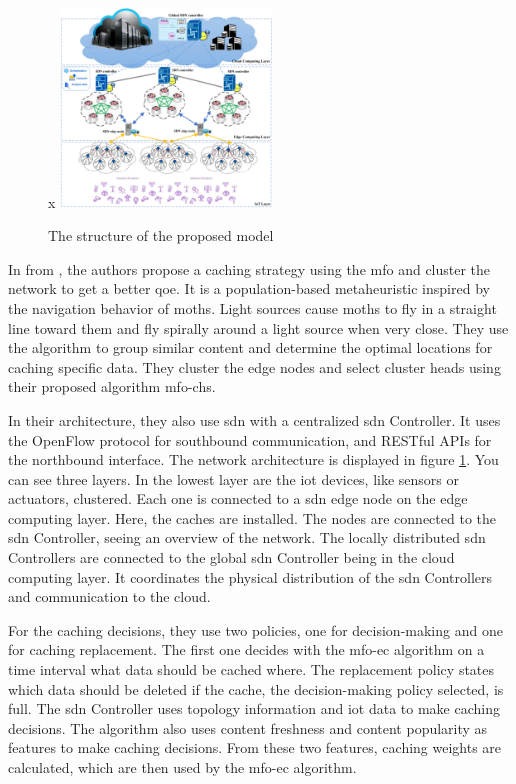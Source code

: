 \documentclass[conference]{IEEEtran}
\begin{document}
	\begin{figure}
x		\centering
		\includegraphics[width=0.5\textwidth]{figures/mfo-architecture.png}
		\caption{The structure of the proposed model \cite{caching-1}}
		\label{fig:mfo-architecture}
	\end{figure}

	In \cite{caching-1} from \citeyear{caching-1}, the authors propose a caching strategy using the \acf{mfo} and cluster the network to get a better \acf{qoe}. It is a population-based metaheuristic inspired by the navigation behavior of moths. Light sources cause moths to fly in a straight line toward them and fly spirally around a light source when very close. They use the algorithm to group similar content and determine the optimal locations for caching specific data. They cluster the edge nodes and select cluster heads using their proposed algorithm \ac{mfo-chs}.

	In their architecture, they also use \ac{sdn} with a centralized \ac{sdn} Controller. It uses the OpenFlow protocol for southbound communication, and RESTful APIs for the northbound interface. The network architecture is displayed in figure \ref{fig:mfo-architecture}. You can see three layers. In the lowest layer are the \ac{iot} devices, like sensors or actuators, clustered. Each one is connected to a \ac{sdn} edge node on the edge computing layer. Here, the caches are installed. The nodes are connected to the \ac{sdn} Controller, seeing an overview of the network. The locally distributed \ac{sdn} Controllers are connected to the global \ac{sdn} Controller being in the cloud computing layer. It coordinates the physical distribution of the \ac{sdn} Controllers and communication to the cloud. 

	For the caching decisions, they use two policies, one for decision-making and one for caching replacement. The first one decides with the \ac{mfo-ec} algorithm on a time interval what data should be cached where. The replacement policy states which data should be deleted if the cache, the decision-making policy selected, is full. The \ac{sdn} Controller uses topology information and \ac{iot} data to make caching decisions. The algorithm also uses content freshness and content popularity as features to make caching decisions. From these two features, caching weights are calculated, which are then used by the \ac{mfo-ec} algorithm. 
\end{document}
